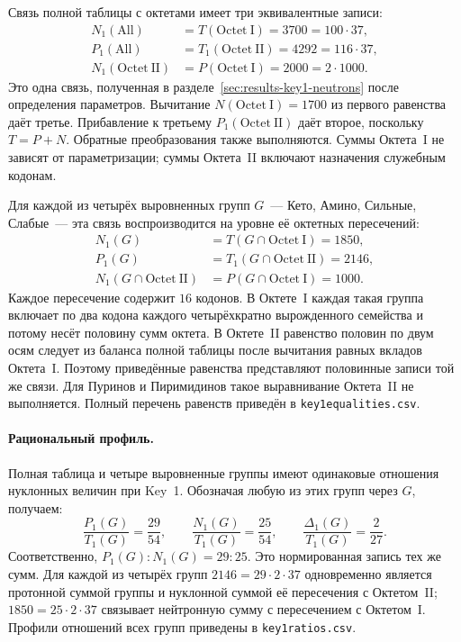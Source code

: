 \documentclass[11pt,a4paper]{article}
\renewcommand{\_}{\origunderscore\allowbreak}
\begin{document}
Связь полной таблицы с октетами имеет три эквивалентные записи:
\begin{align*}
N_1(\mathrm{All})
&=T(\mathrm{Octet~I})=3700=100\cdot37,\\
P_1(\mathrm{All})
&=T_1(\mathrm{Octet~II})=4292=116\cdot37,\\
N_1(\mathrm{Octet~II})
&=P(\mathrm{Octet~I})=2000=2\cdot1000.
\end{align*}
Это одна связь, полученная в
разделе~\ref{sec:results-key1-neutrons} после определения
параметров. Вычитание $N(\mathrm{Octet~I})=1700$ из
первого равенства даёт третье. Прибавление к третьему
$P_1(\mathrm{Octet~II})$ даёт второе, поскольку
$T=P+N$. Обратные преобразования также выполняются.
Суммы Октета~I не зависят от параметризации; суммы
Октета~II включают назначения служебным кодонам.

Для каждой из четырёх выровненных групп $G$~--- Кето,
Амино, Сильные, Слабые~--- эта связь воспроизводится
на уровне её октетных пересечений:
\[
\begin{aligned}
N_1(G)&=T(G\cap\mathrm{Octet~I})=1850,\\
P_1(G)&=T_1(G\cap\mathrm{Octet~II})=2146,\\
N_1(G\cap\mathrm{Octet~II})
&=P(G\cap\mathrm{Octet~I})=1000.
\end{aligned}
\]
Каждое пересечение содержит $16$ кодонов. В Октете~I
каждая такая группа включает по два кодона каждого
четырёхкратно вырожденного семейства и потому несёт
половину сумм октета. В Октете~II равенство половин
по двум осям следует из баланса полной таблицы после
вычитания равных вкладов Октета~I. Поэтому приведённые
равенства представляют половинные записи той же связи.
Для Пуринов и Пиримидинов такое выравнивание Октета~II
не выполняется. Полный перечень равенств приведён в
\texttt{key1\_equalities.csv}.

\paragraph{Рациональный профиль.}
Полная таблица и четыре выровненные группы имеют
одинаковые отношения нуклонных величин при Key~1.
Обозначая любую из этих групп через $G$, получаем:
\[
\frac{P_1(G)}{T_1(G)}=\frac{29}{54},\qquad
\frac{N_1(G)}{T_1(G)}=\frac{25}{54},\qquad
\frac{\Delta_1(G)}{T_1(G)}=\frac{2}{27}.
\]
Соответственно, $P_1(G):N_1(G)=29:25$.
Это нормированная запись тех же сумм. Для каждой из
четырёх групп $2146=29\cdot2\cdot37$ одновременно
является протонной суммой группы и нуклонной суммой
её пересечения с Октетом~II; $1850=25\cdot2\cdot37$
связывает нейтронную сумму с пересечением с Октетом~I.
Профили отношений всех групп приведены в
\texttt{key1\_ratios.csv}.
\end{document}
